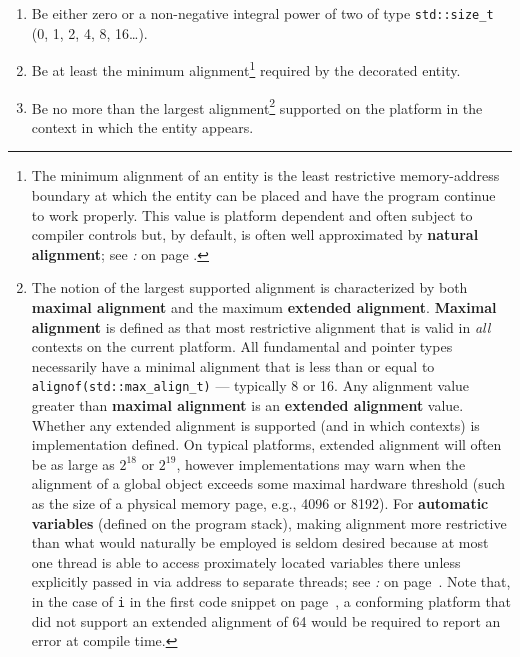 \begin{enumerate}
\item{Be either zero or a non-negative integral power of two of type \texttt{std::size\_t} (0, 1, 2, 4, 8, 16\dots).}
\item{Be at least the minimum alignment\cprotect\footnote{The minimum alignment of an entity is the least restrictive memory-address boundary at which the entity can be placed and have the program continue to work properly. This value is platform dependent and often subject to compiler controls but, by default, is often well approximated by \textbf{natural alignment}; see \textit{: } on page \pageref{natural-alignment}.} required by the decorated entity.}
\item{Be no more than the largest alignment\cprotect\footnote{The notion of the largest supported alignment is characterized by both \textbf{maximal alignment} and the maximum \textbf{extended alignment}. \textbf{Maximal alignment} is defined as that most restrictive alignment that is valid in \emph{all} contexts on the current platform. All fundamental and pointer types necessarily have a minimal alignment that is less than or equal to \texttt{alignof(std::max\_align\_t)} — typically 8 or 16. Any alignment value greater than \textbf{maximal alignment} is an \textbf{extended alignment} value. Whether any extended alignment is supported (and in which contexts) is implementation defined. On typical platforms, extended alignment will often be as large as $2^{18}$ or $2^{19}$, however implementations may warn when the alignment of a global object exceeds some maximal hardware threshold (such as the size of a physical memory page, e.g., 4096 or 8192). For \textbf{automatic variables} (defined on the program stack), making alignment more restrictive than what would naturally be employed  is seldom desired because at most one thread is able to access proximately located variables there unless explicitly passed in via address to separate threads; see \textit{: } on page~\pageref{avoiding-false-sharing-among-distinct-objects-in-a-multi-threaded-program}. Note that, in the case of \texttt{i} in the first code snippet on page~\pageref{restricting-the-alignment-of-a-particular-object}, a conforming platform that did not support an extended alignment of 64 would be required to report an error at compile time.} supported on the platform in the context in which the entity appears.}
\end{enumerate}

